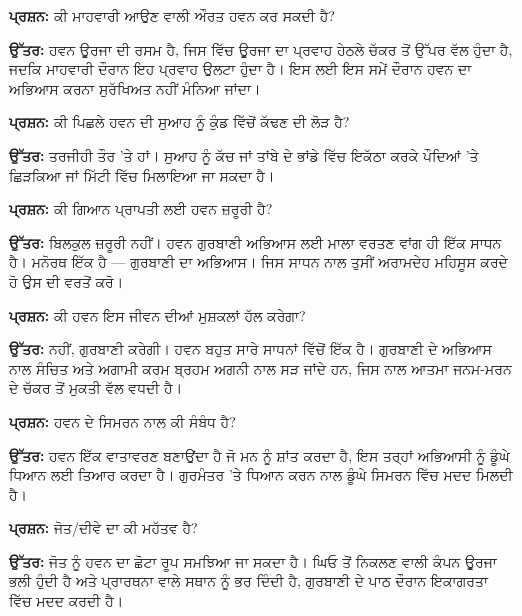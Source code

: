 \documentclass[12pt,a5paper,twoside]{book}  %
\begin{document}
{\textbf{ਪ੍ਰਸ਼ਨ:} ਕੀ ਮਾਹਵਾਰੀ ਆਉਣ ਵਾਲੀ ਔਰਤ ਹਵਨ ਕਰ ਸਕਦੀ ਹੈ?

\textbf{ਉੱਤਰ:} ਹਵਨ ਊਰਜਾ ਦੀ ਰਸਮ ਹੈ, ਜਿਸ ਵਿੱਚ ਊਰਜਾ ਦਾ ਪ੍ਰਵਾਹ ਹੇਠਲੇ ਚੱਕਰ ਤੋਂ ਉੱਪਰ ਵੱਲ ਹੁੰਦਾ ਹੈ, ਜਦਕਿ ਮਾਹਵਾਰੀ ਦੌਰਾਨ ਇਹ ਪ੍ਰਵਾਹ ਉਲਟਾ ਹੁੰਦਾ ਹੈ। ਇਸ ਲਈ ਇਸ ਸਮੇਂ ਦੌਰਾਨ ਹਵਨ ਦਾ ਅਭਿਆਸ ਕਰਨਾ ਸੁਰੱਖਿਅਤ ਨਹੀਂ ਮੰਨਿਆ ਜਾਂਦਾ।

\textbf{ਪ੍ਰਸ਼ਨ:} ਕੀ ਪਿਛਲੇ ਹਵਨ ਦੀ ਸੁਆਹ ਨੂੰ ਕੁੰਡ ਵਿੱਚੋਂ ਕੱਢਣ ਦੀ ਲੋੜ ਹੈ?

\textbf{ਉੱਤਰ:} ਤਰਜੀਹੀ ਤੌਰ 'ਤੇ ਹਾਂ। ਸੁਆਹ ਨੂੰ ਕੱਚ ਜਾਂ ਤਾਂਬੇ ਦੇ ਭਾਂਡੇ ਵਿੱਚ ਇਕੱਠਾ ਕਰਕੇ ਪੌਦਿਆਂ 'ਤੇ ਛਿੜਕਿਆ ਜਾਂ ਮਿੱਟੀ ਵਿੱਚ ਮਿਲਾਇਆ ਜਾ ਸਕਦਾ ਹੈ।

\textbf{ਪ੍ਰਸ਼ਨ:} ਕੀ ਗਿਆਨ ਪ੍ਰਾਪਤੀ ਲਈ ਹਵਨ ਜ਼ਰੂਰੀ ਹੈ?

\textbf{ਉੱਤਰ:} ਬਿਲਕੁਲ ਜ਼ਰੂਰੀ ਨਹੀਂ। ਹਵਨ ਗੁਰਬਾਣੀ ਅਭਿਆਸ ਲਈ ਮਾਲਾ ਵਰਤਣ ਵਾਂਗ ਹੀ ਇੱਕ ਸਾਧਨ ਹੈ। ਮਨੋਰਥ ਇੱਕ ਹੈ — ਗੁਰਬਾਣੀ ਦਾ ਅਭਿਆਸ। ਜਿਸ ਸਾਧਨ ਨਾਲ ਤੁਸੀਂ ਅਰਾਮਦੇਹ ਮਹਿਸੂਸ ਕਰਦੇ ਹੋ ਉਸ ਦੀ ਵਰਤੋਂ ਕਰੋ।

\textbf{ਪ੍ਰਸ਼ਨ:} ਕੀ ਹਵਨ ਇਸ ਜੀਵਨ ਦੀਆਂ ਮੁਸ਼ਕਲਾਂ ਹੱਲ ਕਰੇਗਾ?

\textbf{ਉੱਤਰ:} ਨਹੀਂ, ਗੁਰਬਾਣੀ ਕਰੇਗੀ। ਹਵਨ ਬਹੁਤ ਸਾਰੇ ਸਾਧਨਾਂ ਵਿੱਚੋਂ ਇੱਕ ਹੈ। ਗੁਰਬਾਣੀ ਦੇ ਅਭਿਆਸ ਨਾਲ ਸੰਚਿਤ ਅਤੇ ਅਗਾਮੀ ਕਰਮ ਬ੍ਰਹਮ ਅਗਨੀ ਨਾਲ ਸੜ ਜਾਂਦੇ ਹਨ, ਜਿਸ ਨਾਲ ਆਤਮਾ ਜਨਮ-ਮਰਨ ਦੇ ਚੱਕਰ ਤੋਂ ਮੁਕਤੀ ਵੱਲ ਵਧਦੀ ਹੈ।

\textbf{ਪ੍ਰਸ਼ਨ:} ਹਵਨ ਦੇ ਸਿਮਰਨ ਨਾਲ ਕੀ ਸੰਬੰਧ ਹੈ?

\textbf{ਉੱਤਰ:} ਹਵਨ ਇੱਕ ਵਾਤਾਵਰਣ ਬਣਾਉਂਦਾ ਹੈ ਜੋ ਮਨ ਨੂੰ ਸ਼ਾਂਤ ਕਰਦਾ ਹੈ, ਇਸ ਤਰ੍ਹਾਂ ਅਭਿਆਸੀ ਨੂੰ ਡੂੰਘੇ ਧਿਆਨ ਲਈ ਤਿਆਰ ਕਰਦਾ ਹੈ। ਗੁਰਮੰਤਰ 'ਤੇ ਧਿਆਨ ਕਰਨ ਨਾਲ ਡੂੰਘੇ ਸਿਮਰਨ ਵਿੱਚ ਮਦਦ ਮਿਲਦੀ ਹੈ।

\textbf{ਪ੍ਰਸ਼ਨ:} ਜੋਤ/ਦੀਵੇ ਦਾ ਕੀ ਮਹੱਤਵ ਹੈ?

\textbf{ਉੱਤਰ:} ਜੋਤ ਨੂੰ ਹਵਨ ਦਾ ਛੋਟਾ ਰੂਪ ਸਮਝਿਆ ਜਾ ਸਕਦਾ ਹੈ। ਘਿਓ ਤੋਂ ਨਿਕਲਣ ਵਾਲੀ ਕੰਪਨ ਊਰਜਾ ਭਲੀ ਹੁੰਦੀ ਹੈ ਅਤੇ ਪ੍ਰਾਰਥਨਾ ਵਾਲੇ ਸਥਾਨ ਨੂੰ ਭਰ ਦਿੰਦੀ ਹੈ, ਗੁਰਬਾਣੀ ਦੇ ਪਾਠ ਦੌਰਾਨ ਇਕਾਗਰਤਾ ਵਿੱਚ ਮਦਦ ਕਰਦੀ ਹੈ।

\clearpage
}
\end{document}
